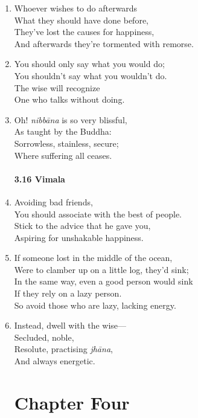 \documentclass[10pt, openany]{book}
\begin{document}
\begin{enumerate}
\item Whoever wishes to do afterwards\\
What they should have done before,\\
They’ve lost the causes for happiness,\\
And afterwards they’re tormented with remorse.

\item You should only say what you would do;\\
You shouldn’t say what you wouldn’t do.\\
The wise will recognize\\
One who talks without doing.

\item Oh! \emph{nibbāna} is so very blissful,\\
As taught by the Buddha:\\
Sorrowless, stainless, secure;\\
Where suffering all ceases.

\subsubsection*{3.16 Vimala}

\item Avoiding bad friends,\\
You should associate with the best of people.\\
Stick to the advice that he gave you,\\
Aspiring for unshakable happiness.

\item If someone lost in the middle of the ocean,\\
Were to clamber up on a little log, they’d sink;\\
In the same way, even a good person would sink\\
If they rely on a lazy person.\\
So avoid those who are lazy, lacking energy.

\item Instead, dwell with the wise—\\
Secluded, noble,\\
Resolute, practising \emph{jhāna},\\
And always energetic.

\chapter*{Chapter Four}


\end{enumerate}
\end{document}
